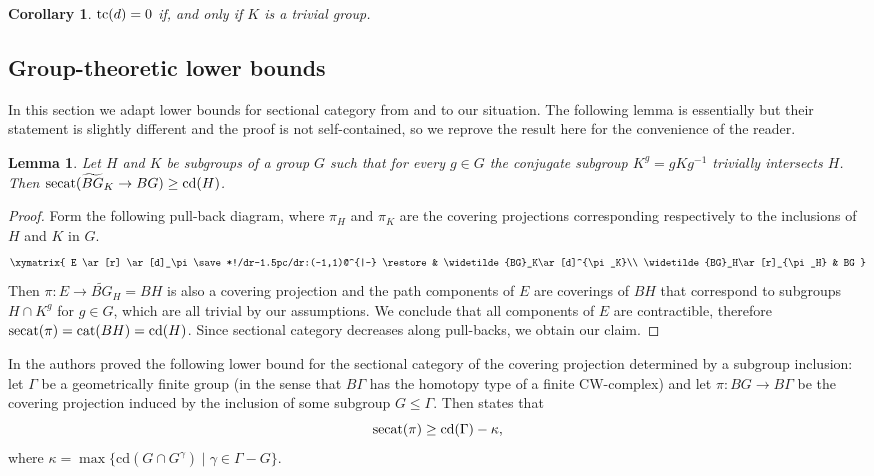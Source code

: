 \documentclass[11pt]{amsart}
\makeatletter
\theoremstyle{plain}
\newtheorem{corollary}[theorem]{Corollary}
\newtheorem{lemma}[theorem]{Lemma}
\theoremstyle{definition}
\newcommand{\cat}{\mathop{\rm cat}\nolimits}
\newcommand{\secat}{\mathop{\rm secat}\nolimits}
\newcommand{\tc}{\mathop{\rm tc}\nolimits}
\newcommand{\cd}{\mathrm{cd}}
\newcommand{\pullbackcorner}[1][dr]{\save*!/#1-1.5pc/#1:(-1,1)@^{|-} \restore}
\makeatother
\begin{document}
\begin{corollary}
$\tc(d)=0$ if, and only if $K$ is a trivial group.
\end{corollary}

\subsection{Group-theoretic lower bounds}\label{subs:Group-theoretic lower bounds}
In this section we adapt lower bounds for sectional category 
from \cite{GrantLuptonOprea2015} and \cite{EBFMO} to our situation. The following
lemma is essentially \cite[Cor. 2.3]{GrantLuptonOprea2015} but their statement is slightly different
and the proof is not self-contained, so we reprove the result here for the convenience of the reader.

\begin{lemma}\label{lem:secat of inclusion}
Let $H$ and $K$ be subgroups of a group $G$ such that for every $g\in G$ the conjugate 
subgroup $K^g=g K g^{-1}$ trivially intersects $H$. Then $\secat(\widetilde{BG}_K\to BG)\ge\cd(H)$.    
\end{lemma}
\begin{proof}
Form the following pull-back diagram, where $\pi_H$ and $\pi_K$ are the covering projections
corresponding respectively to the inclusions of $H$ and $K$ in $G$.
$$\xymatrix{
E \ar[r] \ar[d]_\pi \pullbackcorner & \widetilde{BG}_K\ar[d]^{\pi_K}\\
\widetilde{BG}_H\ar[r]_{\pi_H} & BG 
}$$
Then $\pi\colon E\to \widetilde{BG}_H=BH$ is also a covering projection and the path components 
of $E$ are coverings of 
$BH$ that correspond to subgroups $H\cap K^g$ for $g\in G$, which are all trivial by our assumptions.
We conclude that all components of $E$ are contractible, therefore $\secat(\pi)=\cat(BH)=\cd(H)$. 
Since sectional category decreases along pull-backs, we obtain our claim.
\end{proof}


In \cite{EBFMO} the authors proved the following lower bound for the sectional category of 
the covering projection determined by a subgroup inclusion: let $\Gamma$ be a geometrically finite group 
(in the sense that $B\Gamma$ has the homotopy type of a finite CW-complex) and let 
$\pi\colon BG\to B\Gamma$ be the covering projection induced by the inclusion of some subgroup 
$G\le\Gamma$. Then \cite[Thm. 5.2]{EBFMO} states that
$$\secat(\pi)\ge\cd(\Gamma)-\kappa, $$
where $\kappa=\max\{\cd(G\cap G^\gamma)\mid \gamma\in \Gamma-G\}.$
\end{document}
